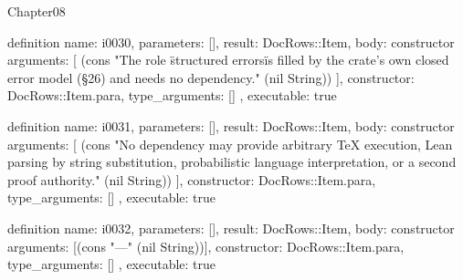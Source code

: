 \begin{lexlean}{Chapter08}
\begin{semanticmodule}
definition{
  name: i0030,
  parameters: [],
  result: DocRows::Item,
  body: constructor{
    arguments: [
      (cons "The role \"structured errors\" is filled by the crate's own closed error model (§26) and needs no dependency." (nil String))
    ],
    constructor: DocRows::Item.para,
    type_arguments: []
  },
  executable: true
}

definition{
  name: i0031,
  parameters: [],
  result: DocRows::Item,
  body: constructor{
    arguments: [
      (cons "No dependency may provide arbitrary TeX execution, Lean parsing by string substitution, probabilistic language interpretation, or a second proof authority." (nil String))
    ],
    constructor: DocRows::Item.para,
    type_arguments: []
  },
  executable: true
}

definition{
  name: i0032,
  parameters: [],
  result: DocRows::Item,
  body: constructor{
    arguments: [(cons "---" (nil String))],
    constructor: DocRows::Item.para,
    type_arguments: []
  },
  executable: true
}
\end{semanticmodule}
\end{lexlean}

